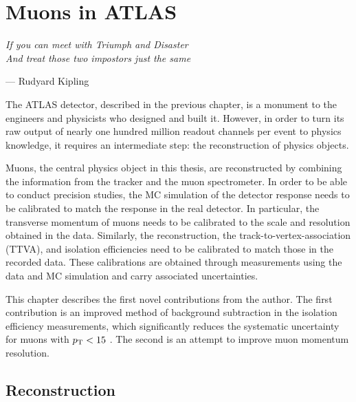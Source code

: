 \chapter{Muons in ATLAS}
\label{sec:muons}
  
\textit{If you can meet with Triumph and Disaster \\ And treat those two impostors just the same}
\vspace{5mm}
\begin{flushright}
--- Rudyard Kipling
\end{flushright}

\thispagestyle{empty}
\newpage
The ATLAS detector, described in the previous chapter, is a monument
to the engineers and physicists who designed and built it. However,
in order to turn its raw output of nearly one hundred million readout
channels per event to physics knowledge, it requires an intermediate step:
the reconstruction of physics objects.

Muons, the central physics object in this thesis, are reconstructed
by combining the information from the tracker and the muon spectrometer.
In order to be able to conduct precision studies, the MC
simulation of the detector response needs to be calibrated to match
the response in the real detector. In particular, the transverse momentum of
muons needs to be calibrated to the scale and resolution obtained in the data.
Similarly, the reconstruction, the track-to-vertex-association (TTVA),
and isolation efficiencies need to be calibrated to match those in 
the recorded data. These calibrations are obtained through measurements
using the data and MC simulation and carry associated uncertainties.

This chapter describes the first novel contributions from the author.
The first contribution is an improved method of background subtraction in the isolation
efficiency measurements, which significantly reduces the systematic
uncertainty for muons with $p_{\text{T}} < 15$ \GeV. The second is an attempt
to improve muon momentum resolution.

\section{Reconstruction}

